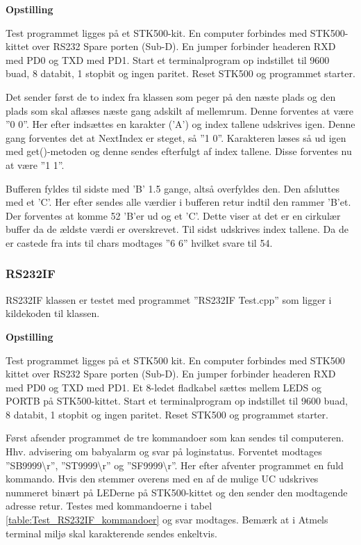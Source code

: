 \textbf{Opstilling}

Test programmet ligges på et STK500-kit.
En computer forbindes med STK500-kittet over RS232 Spare porten (Sub-D).
En jumper forbinder headeren RXD med PD0 og TXD med PD1.
Start et terminalprogram op indstillet til 9600 buad, 8 databit, 1 stopbit og ingen paritet.
Reset STK500 og programmet starter.

Det sender først de to index fra klassen som peger på den næste plads og den plads som skal aflæses næste gang adskilt af mellemrum.
Denne forventes at være ''0 0''. Her efter indsættes en karakter ('A') og index tallene udskrives igen. Denne gang forventes det at NextIndex er steget, så ''1 0''. Karakteren læses så ud igen med get()-metoden og denne sendes efterfulgt af index tallene. Disse forventes nu at være ''1 1''.

Bufferen fyldes til sidste med 'B' 1.5 gange, altså overfyldes den. Den afsluttes med et 'C'. Her efter sendes alle værdier i bufferen retur indtil den rammer 'B'et. Der forventes at komme 52 'B'er ud og et 'C'. Dette viser at det er en cirkulær buffer da de ældste værdi er overskrevet.
Til sidst udskrives index tallene. Da de er castede fra ints til chars modtages ''6 6'' hvilket svare til 54.

\subsubsection{RS232IF}
RS232IF klassen er testet med programmet ''RS232IF Test.cpp'' som ligger i kildekoden til klassen.

\textbf{Opstilling}

Test programmet ligges på et STK500 kit.
En computer forbindes med STK500 kittet over RS232 Spare porten (Sub-D).
En jumper forbinder headeren RXD med PD0 og TXD med PD1. Et 8-ledet fladkabel sættes mellem LEDS og PORTB på STK500-kittet.
Start et terminalprogram op indstillet til 9600 buad, 8 databit, 1 stopbit og ingen paritet.
Reset STK500 og programmet starter.

Først afsender programmet de tre kommandoer som kan sendes til computeren. Hhv. advisering om babyalarm og svar på loginstatus.
Forventet modtages ''SB9999\textbackslash r'', ''ST9999\textbackslash r'' og ''SF9999\textbackslash r''.
Her efter afventer programmet en fuld kommando. Hvis den stemmer overens med en af de mulige UC udskrives nummeret binært på LEDerne på STK500-kittet og den sender den modtagende adresse retur.
Testes med kommandoerne i tabel \ref{table:Test_RS232IF_kommandoer} og svar modtages. Bemærk at i Atmels terminal miljø skal karakterende sendes enkeltvis.

